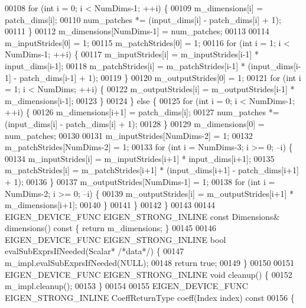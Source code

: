 \begin{DoxyCode}
00108       \textcolor{keywordflow}{for} (\textcolor{keywordtype}{int} i = 0; i < NumDims-1; ++i) \{
00109         m\_dimensions[i] = patch\_dims[i];
00110         num\_patches *= (input\_dims[i] - patch\_dims[i] + 1);
00111       \}
00112       m\_dimensions[NumDims-1] = num\_patches;
00113 
00114       m\_inputStrides[0] = 1;
00115       m\_patchStrides[0] = 1;
00116       \textcolor{keywordflow}{for} (\textcolor{keywordtype}{int} i = 1; i < NumDims-1; ++i) \{
00117         m\_inputStrides[i] = m\_inputStrides[i-1] * input\_dims[i-1];
00118         m\_patchStrides[i] = m\_patchStrides[i-1] * (input\_dims[i-1] - patch\_dims[i-1] + 1);
00119       \}
00120       m\_outputStrides[0] = 1;
00121       \textcolor{keywordflow}{for} (\textcolor{keywordtype}{int} i = 1; i < NumDims; ++i) \{
00122         m\_outputStrides[i] = m\_outputStrides[i-1] * m\_dimensions[i-1];
00123       \}
00124     \} \textcolor{keywordflow}{else} \{
00125       \textcolor{keywordflow}{for} (\textcolor{keywordtype}{int} i = 0; i < NumDims-1; ++i) \{
00126         m\_dimensions[i+1] = patch\_dims[i];
00127         num\_patches *= (input\_dims[i] - patch\_dims[i] + 1);
00128       \}
00129       m\_dimensions[0] = num\_patches;
00130 
00131       m\_inputStrides[NumDims-2] = 1;
00132       m\_patchStrides[NumDims-2] = 1;
00133       \textcolor{keywordflow}{for} (\textcolor{keywordtype}{int} i = NumDims-3; i >= 0; --i) \{
00134         m\_inputStrides[i] = m\_inputStrides[i+1] * input\_dims[i+1];
00135         m\_patchStrides[i] = m\_patchStrides[i+1] * (input\_dims[i+1] - patch\_dims[i+1] + 1);
00136       \}
00137       m\_outputStrides[NumDims-1] = 1;
00138       \textcolor{keywordflow}{for} (\textcolor{keywordtype}{int} i = NumDims-2; i >= 0; --i) \{
00139         m\_outputStrides[i] = m\_outputStrides[i+1] * m\_dimensions[i+1];
00140       \}
00141     \}
00142   \}
00143 
00144   EIGEN\_DEVICE\_FUNC EIGEN\_STRONG\_INLINE \textcolor{keyword}{const} Dimensions& dimensions()\textcolor{keyword}{ const }\{ \textcolor{keywordflow}{return} m\_dimensions; \}
00145 
00146   EIGEN\_DEVICE\_FUNC EIGEN\_STRONG\_INLINE \textcolor{keywordtype}{bool} evalSubExprsIfNeeded(Scalar* \textcolor{comment}{/*data*/}) \{
00147     m\_impl.evalSubExprsIfNeeded(NULL);
00148     \textcolor{keywordflow}{return} \textcolor{keyword}{true};
00149   \}
00150 
00151   EIGEN\_DEVICE\_FUNC EIGEN\_STRONG\_INLINE \textcolor{keywordtype}{void} cleanup() \{
00152     m\_impl.cleanup();
00153   \}
00154 
00155   EIGEN\_DEVICE\_FUNC EIGEN\_STRONG\_INLINE CoeffReturnType coeff(Index index)\textcolor{keyword}{ const}
00156 \textcolor{keyword}{  }\{

\end{DoxyCode}
